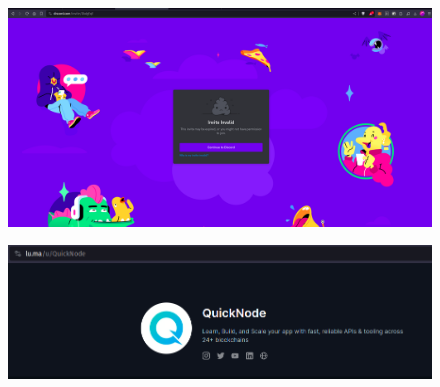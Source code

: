 \begin{figure}
    \centering
    \includegraphics[width=1\linewidth]{Screenshot from 2023-12-18 15-09-14.png}
    
    
\end{figure}

\begin{figure}
    \centering
    \includegraphics[width=1\linewidth]{img//screenshots/Screenshot from 2023-12-18 15-09-37.png}
    
    
\end{figure}
